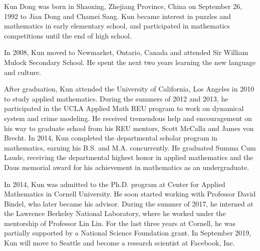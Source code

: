 Kun Dong was born in Shaoxing, Zhejiang Province, China on September 26, 1992 to
Jian Dong and Chamei Sang. Kun became interest in puzzles and mathematics in
early elementary school, and participated in mathematics competitions until the
end of high school.

In 2008, Kun moved to Newmarket, Ontario, Canada and attended Sir William Mulock
Secondary School. He spent the next two years learning the new language and
culture.

After graduation, Kun attended the University of California, Los Angeles in 2010
to study applied mathematics. During the summers of 2012 and 2013, he
participated in the UCLA Applied Math REU program to work on dynamical system
and crime modeling. He received tremendous help and encouragement on his way to
graduate school from his REU mentors, Scott McCalla and James von Brecht. In
2014, Kun completed the departmental scholar program in mathematics, earning his
B.S. and M.A. concurrently. He graduated Summa Cum Laude, receiving the
departmental highest honor in applied mathematics and the Daus memorial award
for his achievement in mathematics as an undergraduate.

In 2014, Kun was admitted to the Ph.D. program at Center for Applied Mathematics
in Cornell University. He soon started working with Professor David Bindel, who
later became his advisor. During the summer of 2017, he interned at the Lawrence
Berkeley National Laboratory, where he worked under the mentorship of Professor
Lin Lin. For the last three years at Cornell, he was partially supported by a
National Science Foundation grant. In September 2019, Kun will move to Seattle
and become a research scientist at Facebook, Inc.